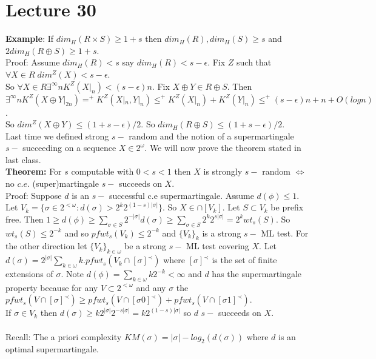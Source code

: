 \documentclass{article}
\begin{document}
  \section{Lecture 30}
  \textbf{Example}: If $dim_H(R\times S) \geq 1+s$ then $dim_H(R), dim_H(S) \geq s$ and $2dim_H(R \oplus S) \geq 1+s$.\\
  Proof: Assume $dim_H(R) < s $ say $dim_H(R) <s- \epsilon$. Fix $Z$ such that $\forall X \in R \; dim^Z(X) < s - \epsilon$. \\
  So $\forall X \in R \exists^\infty n K^Z(X|_n) < (s-\epsilon) n $. Fix $X \oplus Y \in R \oplus S$. Then $\exists^\infty n K^Z(X \oplus Y |_{2n}) =^+ K^Z(X|_n,Y|_n) \leq^+ K^Z(X|_n) + K^Z(Y|_n) \leq^+ (s-\epsilon) n + n + O(log n)$.\\
  So $dim^Z(X \oplus Y) \leq (1+s - \epsilon) / 2$. So $dim_H(R \oplus S) \leq (1+s-\epsilon)/2$.\\
  Last time we defined strong $s-$ random and the notion of a supermartingale $s-$ succeeding on a sequence $X \in 2^\omega$. We will now prove the theorem stated in last class.\\
  \textbf{Theorem:} For $s$ computable with $0 < s < 1$ then $X$ is strongly $s-$ random $\iff $ no $c.e.$ (super)martingale $s-$ succeeds  on $X$.\\
  Proof: Suppose $d$ is an $s-$ successful c.e supermartingale. Assume $d(\phi) \leq 1$. Let $V_k = \{\sigma \in 2^{<\omega}: d(\sigma) > 2^k 2^{(1-s)|\sigma|}\}$. So $X \in \cap [V_k]$. Let $S \subset V_k$ be prefix free. Then $1 \geq d(\phi) \geq \sum_{\sigma \in S} 2^{-|\sigma|}d(\sigma) \geq \sum_{\sigma \in S} 2^k 2^{s|\sigma|} = 2^k wt_s(S)$.  So $wt_s(S) \leq 2^{-k}$ and so $pfwt_s(V_k) \leq 2^{-k}$ and $\{V_k\}_k$ is a strong $s-$ ML test.
  For the other direction let $\{V_k\}_{k \in \omega}$ be a strong $s-$ ML test covering $X$. Let $d(\sigma)= 2^{|\sigma|} \sum_{k\in \omega} k . pfwt_s(V_k\cap [\sigma]^\prec)$ where $[\sigma]^\prec$ is the set of finite extensions of $\sigma$. Note $d(\phi) = \sum_{k \in \omega} k 2^{-k} < \infty$ and $d$ has the supermartingale property because for any $V \subset 2^{<\omega}$ and any $\sigma$ the $pfwt_s(V\cap [\sigma]^\prec) \geq pfwt_s(V \cap [\sigma 0]^\prec)+ pfwt_s(V\cap[\sigma1]^\prec)$.\\
  If $\sigma \in V_k$ then $d(\sigma) \geq k 2^{|\sigma|} 2^{-s | \sigma|} = k 2^{(1-s)|\sigma|}$ so $d$ $s-$ succeeds on $X$. \\
  \\
  Recall: The a priori complexity $KM(\sigma) = |\sigma| -log_2(d(\sigma))$ where $d$ is an optimal supermartingale.  \\
\end{document}

